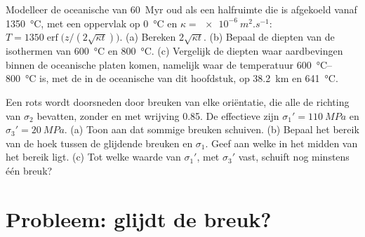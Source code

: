 \begin{exercise}[$\star\star\star$]\label{exo:b1:stress-strain-rheology:11}
Modelleer de oceanische  van \qty{60}{Myr} oud als een halfruimte die is afgekoeld vanaf \qty{1350}{\degreeCelsius}, met een oppervlak op \qty{0}{\degreeCelsius} en
$\kappa = \qty{e-6}{m^2.s^{-1}}$: $T = \num{1350}\operatorname{erf}\bigl(z/(2\sqrt{\kappa t})\bigr)$.
(a) Bereken $2\sqrt{\kappa t}$. (b) Bepaal de diepten van de isothermen van \qty{600}{\degreeCelsius} en \qty{800}{\degreeCelsius}. (c) Vergelijk de diepten waar aardbevingen binnen de oceanische platen komen, namelijk waar de temperatuur \qtyrange{600}{800}{\degreeCelsius} is, met de  in de oceanische  van dit hoofdstuk, op \qty{38.2}{km} en \qty{641}{\degreeCelsius}.
\end{exercise}

\begin{exercise}[$\star\star\star$]\label{exo:b1:stress-strain-rheology:12}
Een rots wordt doorsneden door breuken van elke oriëntatie, die alle de richting van $\sigma_2$ bevatten, zonder  en met wrijving 0.85. De effectieve  zijn $\sigma_1' = \qty{110}{MPa}$ en $\sigma_3' = \qty{20}{MPa}$. (a) Toon aan dat sommige breuken schuiven. (b) Bepaal het bereik van de hoek tussen de glijdende breuken en $\sigma_1$. Geef aan welke in het midden van het bereik ligt. (c) Tot welke waarde van $\sigma_1'$, met $\sigma_3'$ vast, schuift nog minstens één breuk?
\end{exercise}

\section{Probleem: glijdt de breuk?}

